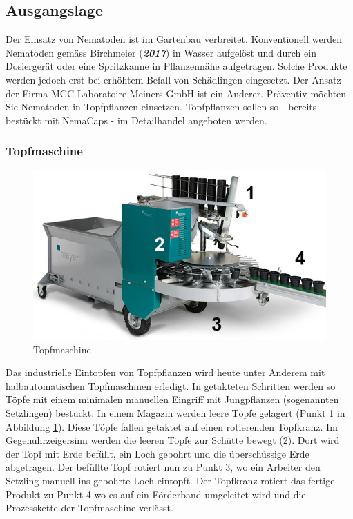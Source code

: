 
\subsection{Ausgangslage}
Der Einsatz von Nematoden ist im Gartenbau verbreitet. Konventionell werden Nematoden gemäss Birchmeier (\textbf{\textit{2017}}) in Wasser aufgelöst und durch ein Dosiergerät oder eine Spritzkanne in Pflanzennähe aufgetragen. Solche Produkte werden jedoch erst bei erhöhtem Befall von Schädlingen eingesetzt. Der Ansatz der Firma MCC Laboratoire Meiners GmbH ist ein Anderer. Präventiv möchten Sie Nematoden in Topfpflanzen einsetzen. Topfpflanzen sollen so - bereits bestückt mit NemaCaps - im Detailhandel angeboten werden. 
\subsubsection{Topfmaschine}
\begin{figure}
	\includegraphics[scale=0.5]{Illustrationen/3-Einleitung/schema_topfmaschine.jpg}
	\caption{Topfmaschine}
	\label{fig:schema_topfmaschine}
\end{figure}
Das industrielle Eintopfen von Topfpflanzen wird heute unter Anderem mit halbautomatischen Topfmaschinen erledigt. In getakteten Schritten werden so Töpfe mit einem minimalen manuellen Eingriff mit Jungpflanzen (sogenannten Setzlingen) bestückt. In einem Magazin werden leere Töpfe gelagert (Punkt 1 in Abbildung \ref{fig:schema_topfmaschine}). Diese Töpfe fallen getaktet auf einen rotierenden Topfkranz. Im Gegenuhrzeigersinn werden die leeren Töpfe zur Schütte bewegt (2). Dort wird der Topf mit Erde befüllt, ein Loch gebohrt und die überschüssige Erde abgetragen. Der befüllte Topf rotiert nun zu Punkt 3, wo ein Arbeiter den Setzling manuell ins gebohrte Loch eintopft. Der Topfkranz rotiert das fertige Produkt zu Punkt 4 wo es auf ein Förderband umgeleitet wird und die Prozesskette der Topfmaschine verlässt.

